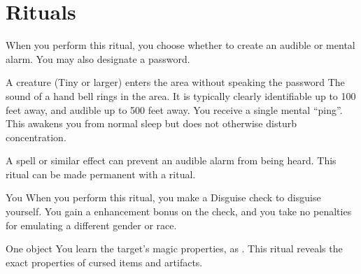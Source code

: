 \section{Rituals}

\small

\spelldur{\durext \dismissable}
\spellspecial When you perform this ritual, you choose whether to create an audible or mental alarm. You may also designate a password.
\spellline
\begin{spelltrigger}{A creature (Tiny or larger) enters the area without speaking the password}
     The sound of a hand bell rings in the area. It is typically clearly identifiable up to 100 feet away, and audible up to 500 feet away.
     You receive a single mental ``ping''. This awakens you from normal sleep but does not otherwise disturb concentration.
\end{spelltrigger}
\spellnotes A  spell or similar effect can prevent an audible alarm from being heard. This ritual can be made permanent with a  ritual.

\spelldur{\durlong}
\begin{spelltarget}{You}
    \spelleffect When you perform this ritual, you make a Disguise check to disguise yourself. You gain a  enhancement bonus on the check, and you take no penalties for emulating a different gender or race.
\end{spelltarget}

\begin{spelltarget}{One object}
    \spelleffect You learn the target's magic properties, as . This ritual reveals the exact properties of cursed items and artifacts.
\end{spelltarget}

